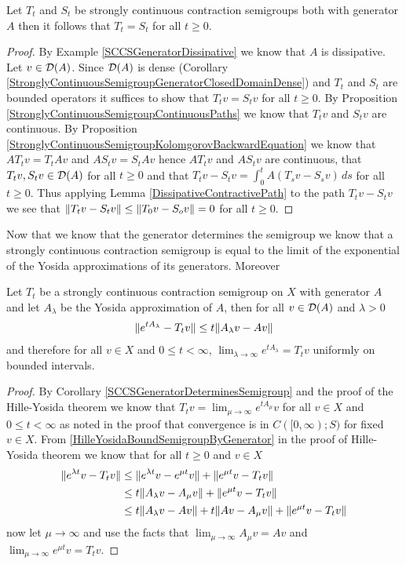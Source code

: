 \begin{cor}\label{SCCSGeneratorDeterminesSemigroup}Let $T_t$ and $S_t$ be strongly continuous contraction semigroups both with generator $A$ then it follows that $T_t=S_t$ for all $t \geq 0$.
\end{cor}
\begin{proof}
By Example \ref{SCCSGeneratorDissipative} we know that $A$ is dissipative.  Let $v \in \mathcal{D}(A)$.  Since $\mathcal{D}(A)$ is dense (Corollary \ref{StronglyContinuousSemigroupGeneratorClosedDomainDense}) and $T_t$ and $S_t$ are bounded operators it suffices to show that $T_t v = S_t v$ for all $t \geq 0$.  By Proposition \ref{StronglyContinuousSemigroupContinuousPaths} we know that $T_tv$ and $S_tv$ are continuous.  By Proposition \ref{StronglyContinuousSemigroupKolomgorovBackwardEquation} we know that $A T_t v = T_t Av$ and $A S_t v = S_t Av$ hence $A T_t v$ and $A S_t v$ are continuous, that $T_tv, S_tv \in \mathcal{D}(A)$ for all $t \geq 0$ and that $T_tv - S_tv = \int_0^t A (T_s v - S_s v) \, ds$ for all $t \geq 0$.  Thus applying Lemma \ref{DissipativeContractivePath} to the path
$T_t v - S_t v$ we see that $\lVert T_t v - S_t v \rVert \leq \lVert T_0 v - S_o v \rVert  = 0$ for all $t \geq 0$.  
\end{proof}

Now that we know that the generator determines the semigroup we know that a strongly continuous contraction semigroup is equal to the limit of the exponential of the Yosida approximations of its generators.  Moreover 
\begin{cor}\label{YosidaApproximationContinuity}Let $T_t$ be a strongly continuous contraction semigroup on $X$ with generator $A$  and let $A_\lambda$ be the Yosida approximation of $A$, then for all $v \in \mathcal{D}(A)$ and $\lambda > 0$ 
\begin{align*}
\lVert e^{tA_\lambda} - T_t v \rVert \leq t \lVert A_\lambda v - Av \rVert
\end{align*}
and therefore for all $v \in X$ and $0 \leq t < \infty$, $\lim_{\lambda \to \infty} e^{t A_\lambda} = T_t v$ uniformly on bounded intervals.
\end{cor}
\begin{proof}
By Corollary \ref{SCCSGeneratorDeterminesSemigroup} and the proof of the Hille-Yosida theorem we know that $T_t v = \lim_{\mu \to \infty} e^{t A_\mu} v$ for all $v \in X$ and $0 \leq t < \infty$ as noted in the proof that convergence is in $C([0,\infty); S)$ for fixed $v \in X$.  From \eqref{HilleYosidaBoundSemigroupByGenerator} in the proof of Hille-Yosida theorem we know that for all $t\geq 0$ and $v \in X$
\begin{align*}
\lVert e^{\lambda t}v  - T_tv \rVert &\leq \lVert e^{\lambda t}v  - e^{\mu t} v \rVert + \lVert e^{\mu t}v  - T_tv \rVert \\
&\leq t\lVert A_\lambda v - A_\mu v \rVert + \lVert e^{\mu t}v  - T_tv \rVert \\
&\leq t\lVert A_\lambda v - A v \rVert + t\lVert A v - A_\mu v \rVert + \lVert e^{\mu t}v  - T_tv \rVert \\
\end{align*}
now let $\mu \to \infty$ and use the facts that $\lim_{\mu \to \infty} A_\mu v = Av$ and $\lim_{\mu \to \infty} e^{\mu t}v  = T_tv$.  
\end{proof}

